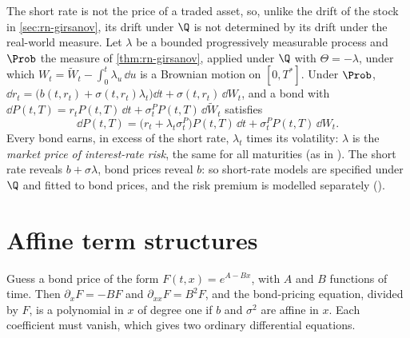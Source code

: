 \begin{remark}\label{rem:ir-market-price}
The short rate is not the price of a traded asset, so, unlike the drift of the stock in
\cref{sec:rn-girsanov}, its drift under $\Q$ is not determined by its drift under the real-world
measure. Let $\lambda$ be a bounded progressively measurable process and $\Prob$ the measure of
\cref{thm:rn-girsanov}, applied under $\Q$ with $\Theta=-\lambda$, under which
$W_t=\widetilde W_t-\int_0^t\lambda_u\,\dd u$ is a Brownian motion on $[0,T^*]$. Under $\Prob$,
$\dd r_t=\big(b(t,r_t)+\sigma(t,r_t)\lambda_t\big)\dd t+\sigma(t,r_t)\,\dd W_t$, and a bond with
$\dd P(t,T)=r_tP(t,T)\,\dd t+\sigma^P_tP(t,T)\,\dd\widetilde W_t$ satisfies
\[
  \dd P(t,T)=\big(r_t+\lambda_t\sigma^P_t\big)P(t,T)\,\dd t+\sigma^P_tP(t,T)\,\dd W_t .
\]
Every bond earns, in excess of the short rate, $\lambda_t$ times its volatility: $\lambda$ is the
\emph{market price of interest-rate risk}, the same for all maturities (as in ).
The short rate reveals $b+\sigma\lambda$, bond prices reveal $b$: so short-rate models are specified
under $\Q$ and fitted to bond prices, and the risk premium is modelled separately
().
\end{remark}

\section{Affine term structures}\label{sec:ir-affine}

Guess a bond price of the form $F(t,x)=e^{A-Bx}$, with $A$ and $B$ functions of time. Then
$\partial_xF=-BF$ and $\partial_{xx}F=B^2F$, and the bond-pricing equation, divided by $F$, is a
polynomial in $x$ of degree one if $b$ and $\sigma^2$ are affine in $x$. Each coefficient must
vanish, which gives two ordinary differential equations.

